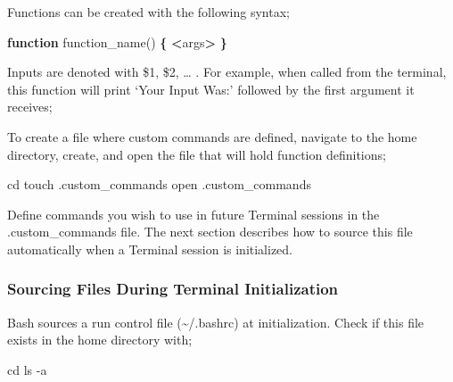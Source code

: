 \documentclass[]{article}
\newenvironment{Shaded}{\begin{snugshade}}{\end{snugshade}}
\newcommand{\KeywordTok}[1]{\textcolor[rgb]{0.13,0.29,0.53}{\textbf{#1}}}
\newcommand{\StringTok}[1]{\textcolor[rgb]{0.31,0.60,0.02}{#1}}
\newcommand{\FunctionTok}[1]{\textcolor[rgb]{0.00,0.00,0.00}{#1}}
\newcommand{\VariableTok}[1]{\textcolor[rgb]{0.00,0.00,0.00}{#1}}
\newcommand{\OperatorTok}[1]{\textcolor[rgb]{0.81,0.36,0.00}{\textbf{#1}}}
\newcommand{\BuiltInTok}[1]{#1}
\newcommand{\ExtensionTok}[1]{#1}
\newcommand{\NormalTok}[1]{#1}
\begin{document}
Functions can be created with the following syntax;

\begin{Shaded}
\begin{Highlighting}[]
\KeywordTok{function}\FunctionTok{ function_name()} \KeywordTok{\{}
 \OperatorTok{<}\ExtensionTok{args}\OperatorTok{>} 
\KeywordTok{\}}
\end{Highlighting}
\end{Shaded}

Inputs are denoted with \$1, \$2, \ldots{} . For example, when called
from the terminal, this function will print `Your Input Was:' followed
by the first argument it receives;

\begin{Shaded}
\end{Shaded}

To create a file where custom commands are defined, navigate to the home
directory, create, and open the file that will hold function
definitions;

\begin{Shaded}
\begin{Highlighting}[]
\BuiltInTok{cd} 
\FunctionTok{touch}\NormalTok{ .custom_commands}
\ExtensionTok{open}\NormalTok{ .custom_commands}
\end{Highlighting}
\end{Shaded}

Define commands you wish to use in future Terminal sessions in the
.custom\_commands file. The next section describes how to source this
file automatically when a Terminal session is initialized.

\subsubsection{Sourcing Files During Terminal Initialization}

Bash sources a run control file (\textasciitilde{}/.bashrc) at
initialization. Check if this file exists in the home directory with;

\begin{Shaded}
\begin{Highlighting}[]
\BuiltInTok{cd}
\FunctionTok{ls}\NormalTok{ -a}
\end{Highlighting}
\end{Shaded}
\end{document}
